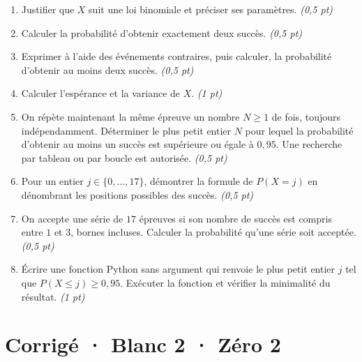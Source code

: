\begin{enumerate}

\item Justifier que $X$ suit une loi binomiale et préciser ses paramètres. \hfill\textit{(0{,}5 pt)}

\item Calculer la probabilité d'obtenir exactement deux succès. \hfill\textit{(0{,}5 pt)}

\item Exprimer à l'aide des événements contraires, puis calculer, la probabilité d'obtenir au moins deux succès. \hfill\textit{(0{,}5 pt)}

\item Calculer l'espérance et la variance de $X$. \hfill\textit{(1 pt)}

\item On répète maintenant la même épreuve un nombre $N\ge1$ de fois, toujours indépendamment. Déterminer le plus petit entier $N$ pour lequel la probabilité d'obtenir au moins un succès est supérieure ou égale à $0{,}95$. Une recherche par tableau ou par boucle est autorisée. \hfill\textit{(0{,}5 pt)}

\item Pour un entier $j\in\{0,\ldots,17\}$, démontrer la formule de $P(X=j)$ en dénombrant les positions possibles des succès. \hfill\textit{(0{,}5 pt)}

\item On accepte une série de $17$ épreuves si son nombre de succès est compris entre $1$ et $3$, bornes incluses. Calculer la probabilité qu'une série soit acceptée. \hfill\textit{(0{,}5 pt)}

\item Écrire une fonction Python sans argument qui renvoie le plus petit entier $j$ tel que $P(X\le j)\ge0{,}95$. Exécuter la fonction et vérifier la minimalité du résultat. \hfill\textit{(1 pt)}

\end{enumerate}

\ifmxteacher\mxnewpage

\section*{Corrigé · Blanc 2 · Zéro 2}\label{cor:8-2}

